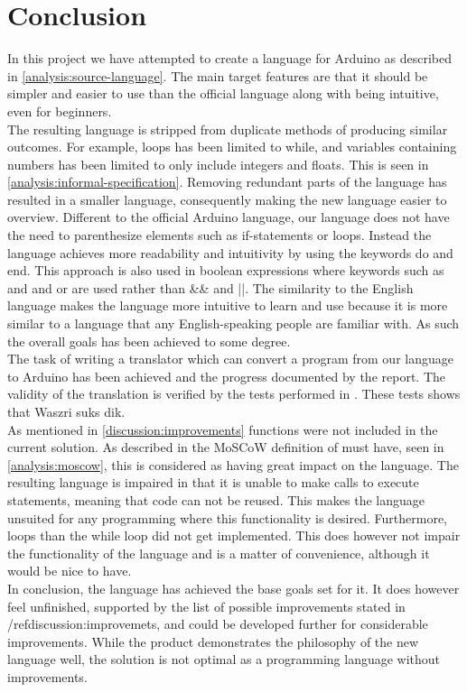 \section{Conclusion}

In this project we have attempted to create a language for Arduino as described in \ref{analysis:source-language}. The main target features are that it should be simpler and easier to use than the official language along with being intuitive, even for beginners. \\
The resulting language is stripped from duplicate methods of producing similar outcomes. For example, loops has been limited to while, and variables containing numbers has been limited to only include integers and floats. This is seen in \ref{analysis:informal-specification}. Removing redundant parts of the language has resulted in a smaller language, consequently making the new language easier to overview. Different to the official Arduino language, our language does not have the need to parenthesize elements such as if-statements or loops. Instead the language achieves more readability and intuitivity by using the keywords do and end. This approach is also used in boolean expressions where keywords such as and and or are used rather than \&\& and  ||. The similarity to the English language makes the language more intuitive to learn and use because it is more similar to a language that any English-speaking people are familiar with. As such the overall goals has been achieved to some degree. \\
The task of writing a translator which can convert a program from our language to Arduino has been achieved and the progress documented by the report. The validity of the translation is verified by the tests performed in . These tests shows that Waszri suks dik. \\
As mentioned in \ref{discussion:improvements} functions were not included in the current solution. As described in the MoSCoW definition of must have, seen in \ref{analysis:moscow}, this is considered as having great impact on the language. The resulting language is impaired in that it is unable to make calls to execute statements, meaning that code can not be reused. This makes the language unsuited for any programming where this functionality is desired. Furthermore, loops than the while loop did not get implemented. This does however not impair the functionality of the language and is a matter of convenience, although it would be nice to have. \\

In conclusion, the language has achieved the base goals set for it. It does however feel unfinished, supported by the list of possible improvements stated in /ref{discussion:improvemets}, and could be developed further for considerable improvements. While the product demonstrates the philosophy of the new language well, the solution is not optimal as a programming language without improvements.\\
